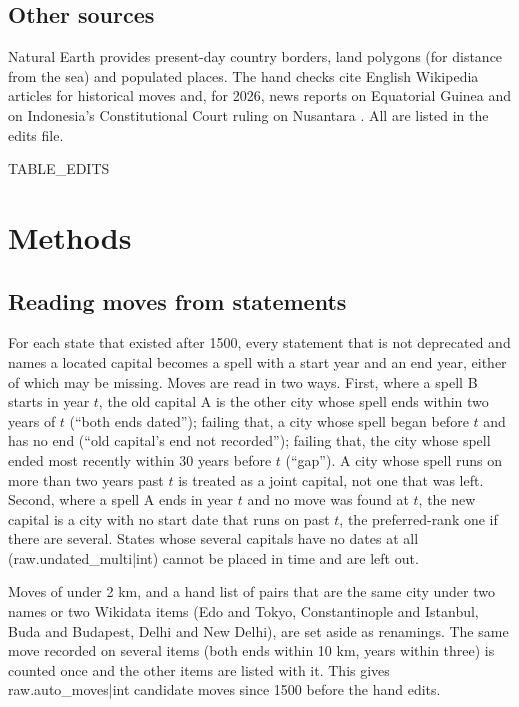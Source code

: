 \documentclass[11pt,a4paper]{article}
\begin{document}
\subsection{Other sources}
Natural Earth \citep{naturalearth} provides present-day country borders, land polygons (for distance from the sea) and populated places. The hand checks cite English Wikipedia articles for historical moves and, for 2026, news reports on Equatorial Guinea \citep{africanews} and on Indonesia's Constitutional Court ruling on Nusantara \citep{star,jakpost}. All are listed in the edits file.

{{TABLE_EDITS}}

\section{Methods}
\subsection{Reading moves from statements}
For each state that existed after 1500, every statement that is not deprecated and names a located capital becomes a spell with a start year and an end year, either of which may be missing. Moves are read in two ways. First, where a spell B starts in year $t$, the old capital A is the other city whose spell ends within two years of $t$ (``both ends dated''); failing that, a city whose spell began before $t$ and has no end (``old capital's end not recorded''); failing that, the city whose spell ended most recently within 30 years before $t$ (``gap''). A city whose spell runs on more than two years past $t$ is treated as a joint capital, not one that was left. Second, where a spell A ends in year $t$ and no move was found at $t$, the new capital is a city with no start date that runs on past $t$, the preferred-rank one if there are several. States whose several capitals have no dates at all ({{raw.undated_multi|int}}) cannot be placed in time and are left out.

Moves of under 2 km, and a hand list of pairs that are the same city under two names or two Wikidata items (Edo and Tokyo, Constantinople and Istanbul, Buda and Budapest, Delhi and New Delhi), are set aside as renamings. The same move recorded on several items (both ends within 10 km, years within three) is counted once and the other items are listed with it. This gives {{raw.auto_moves|int}} candidate moves since 1500 before the hand edits.
\end{document}
